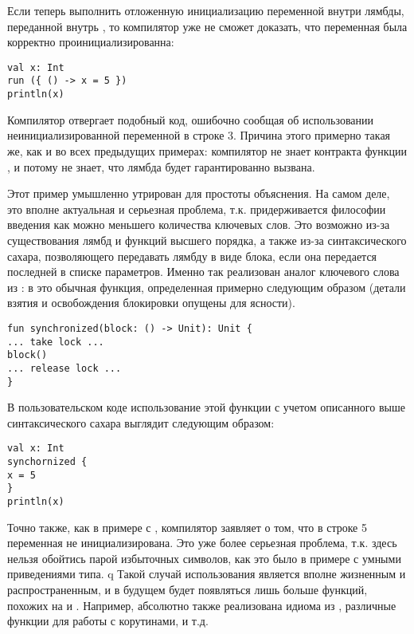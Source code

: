 Если теперь выполнить отложенную инициализацию переменной внутри лямбды, переданной внутрь , то компилятор уже не сможет доказать, что переменная была корректно проинициализированна:

\begin{verbatim}
val x: Int
run ({ () -> x = 5 })
println(x)
\end{verbatim}

Компилятор отвергает подобный код, ошибочно сообщая об использовании неинициализированной переменной в строке 3. Причина этого примерно такая же, как и во всех предыдущих примерах: компилятор не знает контракта функции , и потому не знает, что лямбда  будет гарантированно вызвана.

Этот пример умышленно утрирован для простоты объяснения. На самом деле, это вполне актуальная и серьезная проблема, т.к.  придерживается философии введения как можно меньшего количества ключевых слов. Это возможно из-за существования лямбд и функций высшего порядка, а также из-за синтаксического сахара, позволяющего передавать лямбду в виде блока, если она передается последней в списке параметров. Именно так реализован аналог ключевого слова  из : в  это обычная функция, определенная примерно следующим образом (детали взятия и освобождения блокировки опущены для ясности).

\begin{verbatim}
fun synchronized(block: () -> Unit): Unit {
... take lock ...
block()
... release lock ...
}
\end{verbatim}

В пользовательском коде использование этой функции с учетом описанного выше синтаксического сахара выглядит следующим образом:

\begin{verbatim}
val x: Int
synchornized {
x = 5
}
println(x)
\end{verbatim}

Точно также, как в примере с , компилятор заявляет о том, что в строке 5 переменная  не инициализирована. Это уже более серьезная проблема, т.к. здесь нельзя обойтись парой избыточных символов, как это было в примере с умными приведениями типа.
q
Такой случай использования является вполне жизненным и распространенным, и в будущем будет появляться лишь больше функций, похожих на  и . Например, абсолютно также реализована идиома  из , различные функции для работы с корутинами, и т.д.

